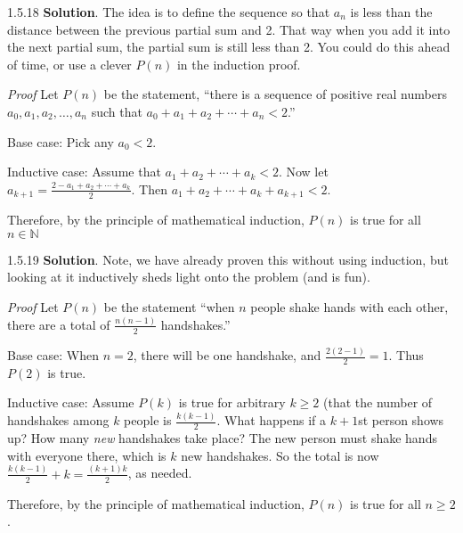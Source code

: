 \documentclass[11pt,]{book}
\makeatletter
\theoremstyle{ptxplainnotitle}
\theoremstyle{ptxplaintitle}
\renewcommand*{\proofname}{Proof}
\renewenvironment{proof}[1][\proofname]{\par
  \pushQED{\qed}%
  \normalfont \topsep6\p@\@plus6\p@\relax
  \trivlist
  \item\relax
    {\itshape
    #1\@addpunct{.}}\hspace\labelsep\ignorespaces
}{%
  \popQED\endtrivlist\@endpefalse
}
\theoremstyle{ptxdefinitionnotitle}
\theoremstyle{ptxdefinitiontitle}
\theoremstyle{ptxdefinitionnotitle}
\theoremstyle{ptxdefinitiontitle}
\theoremstyle{ptxdefinitionnotitle}
\theoremstyle{ptxdefinitiontitle}
\theoremstyle{ptxdefinitiontitlenonumber}
\theoremstyle{ptxdefinitiontitlenonumber}
\numberwithin{equation}{chapter}
\newcommand{\N}{\mathbb N}
\newcommand{\lt}{<}
\makeatother
\begin{document}
\begin{divisionexercise}{1.5.18}
\textbf{Solution}.\quad%
\hypertarget{p-627}{}%
The idea is to define the sequence so that \(a_n\) is less than the distance between the previous partial sum and 2. That way when you add it into the next partial sum, the partial sum is still less than 2. You could do this ahead of time, or use a clever \(P(n)\) in the induction proof.%
\begin{proof}\hypertarget{proof-16}{}
\hypertarget{p-628}{}%
Let \(P(n)\) be the statement, ``there is a sequence of positive real numbers \(a_0, a_1, a_2, \ldots, a_n\) such that \(a_0 + a_1 + a_2 + \cdots + a_n \lt  2\).''%
\par
\hypertarget{p-629}{}%
Base case: Pick any \(a_0 \lt  2\).%
\par
\hypertarget{p-630}{}%
Inductive case: Assume that \(a_1 + a_2 + \cdots + a_k \lt  2\). Now let \(a_{k+1} = \frac{2- a_1 + a_2 + \cdots + a_k}{2}\). Then \(a_1 + a_2 + \cdots +a_k + a_{k+1} \lt  2\).%
\par
\hypertarget{p-631}{}%
Therefore, by the principle of mathematical induction, \(P(n)\) is true for all \(n \in \N\)%
\end{proof}
\end{divisionexercise}%
\begin{divisionexercise}{1.5.19}
\textbf{Solution}.\quad%
\hypertarget{p-633}{}%
Note, we have already proven this without using induction, but looking at it inductively sheds light onto the problem (and is fun).%
\begin{proof}\hypertarget{proof-17}{}
\hypertarget{p-634}{}%
Let \(P(n)\) be the statement ``when \(n\) people shake hands with each other, there are a total of \(\frac{n(n-1)}{2}\) handshakes.''%
\par
\hypertarget{p-635}{}%
Base case: When \(n=2\), there will be one handshake, and \(\frac{2(2-1)}{2} = 1\).  Thus \(P(2)\) is true.%
\par
\hypertarget{p-636}{}%
Inductive case: Assume \(P(k)\) is true for arbitrary \(k\ge 2\) (that the number of handshakes among \(k\) people is \(\frac{k(k-1)}{2}\).  What happens if a \(k+1\)st person shows up?  How many \emph{new} handshakes take place?  The new person must shake hands with everyone there, which is \(k\) new  handshakes.  So the total is now \(\frac{k(k-1)}{2} + k = \frac{(k+1)k}{2}\), as needed.%
\par
\hypertarget{p-637}{}%
Therefore, by the principle of mathematical induction, \(P(n)\) is true for all \(n \ge 2\).%
\end{proof}
\end{divisionexercise}%
\end{document}
